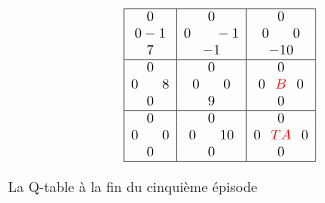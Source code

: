 \begin{figure}[!ht]
\centering
$$\begin{array}{|c|c|c|}
\hline
0                      & 0                           & 0 \\
0 -1 & 0 \hspace*{0.6cm} -1 & 0\hspace*{0.6cm}0 \\
7          & -1          & -10 \\
\hline
0          & 0                            & 0 \\
0\hspace*{0.6cm}8   & 0\hspace*{0.6cm} 0                  & 0\hspace*{0.25cm}\textcolor{red}{B}\hspace*{0.25cm} 0 \\
0           & 9         & 0 \\
\hline
0          & 0                         & 0\\
0\hspace*{0.6cm} 0                     & 0\hspace*{0.6cm}10                & 0\hspace*{0.25cm}\textcolor{red}{T A}\hspace*{0.25cm} 0 \\
0                            & 0        & 0 \\
\hline
\end{array}
$$
\caption{La Q-table à la fin du cinquième épisode}
\end{figure}



